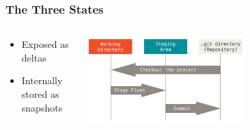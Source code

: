 \documentclass[hyperref={pdfpagelabels=false}]{beamer}
\begin{document}
\begin{frame}
\frametitle{The Three States}
\begin{columns}
\begin{column}{0.4\textwidth}
	\begin{itemize}
		\item Exposed as deltas
		\item Internally stored as snapshots
	\end{itemize}
\end{column}
\begin{column}{0.6\textwidth}  %
    \begin{center}
    \includegraphics[width=0.6\textwidth]{areas}
    
    \end{center}
\end{column}
\end{columns}
\end{frame}
\end{document}
